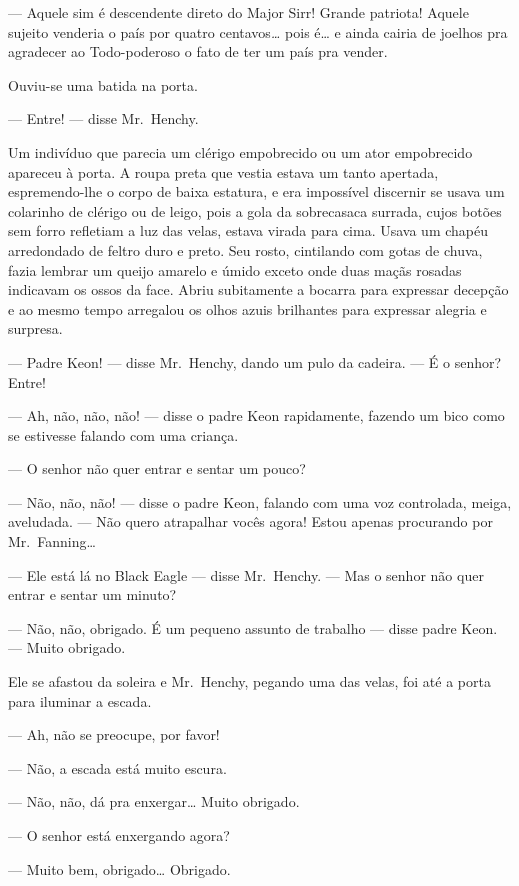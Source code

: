 --- Aquele sim é descendente direto do Major Sirr!  Grande patriota!  Aquele
sujeito venderia o país por quatro centavos\textit{\ldots{}} pois é\ldots{} e
ainda cairia de joelhos pra agradecer ao Todo-poderoso o fato de ter um país
pra vender.

Ouviu-se uma batida na porta.

--- Entre! --- disse Mr.~Henchy.

Um indivíduo que parecia um clérigo empobrecido ou um ator empobrecido apareceu
à porta.  A roupa preta que vestia estava um tanto apertada, espremendo-lhe o
corpo de baixa estatura, e era impossível discernir se usava um colarinho de
clérigo ou de leigo, pois a gola da sobrecasaca surrada, cujos botões sem forro
refletiam a luz das velas, estava virada para cima.  Usava um chapéu
arredondado de feltro duro e preto.  Seu rosto, cintilando com gotas de chuva,
fazia lembrar um queijo amarelo e úmido exceto onde duas maçãs rosadas
indicavam os ossos da face.  Abriu subitamente a bocarra para expressar
decepção e ao mesmo tempo arregalou os olhos azuis brilhantes para expressar
alegria e surpresa.

--- Padre Keon! --- disse Mr.~Henchy, dando um pulo da cadeira.  --- É o
senhor? Entre!

--- Ah, não, não, não! --- disse o padre Keon rapidamente, fazendo um bico como
se estivesse falando com uma criança.

--- O senhor não quer entrar e sentar um pouco?

--- Não, não, não! --- disse o padre Keon, falando com uma voz controlada,
meiga, aveludada.  --- Não quero atrapalhar vocês agora!  Estou apenas
procurando por Mr.~Fanning\ldots{}

--- Ele está lá no Black Eagle --- disse Mr.~Henchy.  --- Mas o senhor não quer
entrar e sentar um minuto?

--- Não, não, obrigado.  É um pequeno assunto de trabalho --- disse padre Keon.
--- Muito obrigado.

Ele se afastou da soleira e Mr.~Henchy, pegando uma das velas, foi até a porta
para iluminar a escada.

--- Ah, não se preocupe, por favor!

--- Não, a escada está muito escura.

--- Não, não, dá pra enxergar\ldots{} Muito obrigado.

--- O senhor está enxergando agora?

--- Muito bem, obrigado\ldots{} Obrigado.

